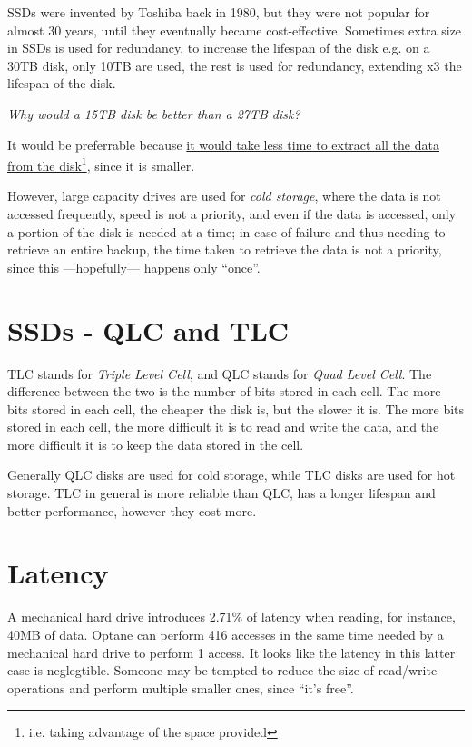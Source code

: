 SSDs were invented by Toshiba back in 1980, but they were not popular for almost 30 years, until they eventually became cost-effective. Sometimes extra size in SSDs is used for redundancy, to increase the lifespan of the disk e.g. on a 30TB disk, only 10TB are used, the rest is used for redundancy, extending x3 the lifespan of the disk.

\begin{center}
   \textit{Why would a 15TB disk be better than a 27TB disk?}\\
\end{center}
It would be preferrable because \ul{it would take less time to extract all the data from the disk}\footnote{i.e. taking advantage of the space provided}, since it is smaller.

However, large capacity drives are used for \textit{cold storage}, where the data is not accessed frequently, speed is not a priority, and even if the data is accessed, only a portion of the disk is needed at a time; in case of failure and thus needing to retrieve an entire backup, the time taken to retrieve the data is not a priority, since this ---hopefully--- happens only ``once''.

\section{SSDs - QLC and TLC}

TLC stands for \textit{Triple Level Cell}, and QLC stands for \textit{Quad Level Cell}. The difference between the two is the number of bits stored in each cell. The more bits stored in each cell, the cheaper the disk is, but the slower it is. The more bits stored in each cell, the more difficult it is to read and write the data, and the more difficult it is to keep the data stored in the cell.

Generally QLC disks are used for cold storage, while TLC disks are used for hot storage.
TLC in general is more reliable than QLC, has a longer lifespan and better performance, however they cost more.

\section{Latency}
A mechanical hard drive introduces 2.71\% of latency when reading, for instance, 40MB of data.  Optane can perform 416 accesses in the same time needed by a mechanical hard drive to perform 1 access. It looks like the latency in this latter case is neglegtible. Someone may be tempted to reduce the size of read/write operations and perform multiple smaller ones, since ``it's free''. 

